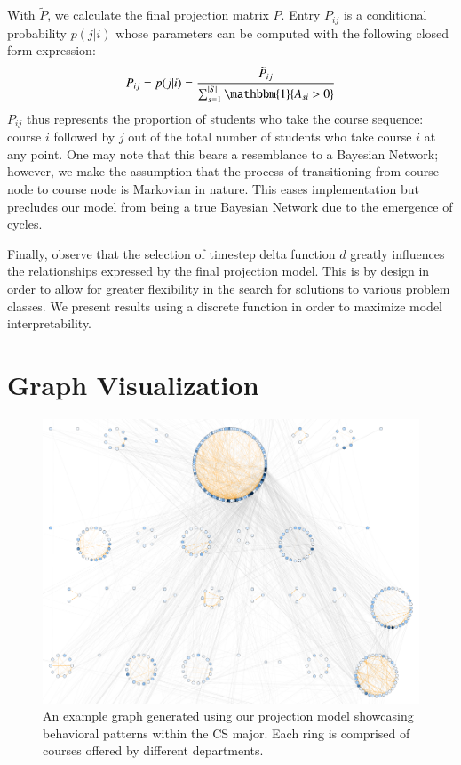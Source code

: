 \documentclass{sigchi}
\begin{document}
With $\tilde{P}$, we calculate the final projection matrix $P$. Entry $P_{ij}$ is a conditional probability $p(j|i)$ whose parameters can be computed with the following closed form expression:
\begin{equation}
    P_{ij} = p(j|i) = \frac{\tilde{P}_{ij}}{\sum_{s=1}^{|S|}\mathbbm{1}\{A_{si} > 0\}}
\end{equation}
$P_{ij}$ thus represents the proportion of students who take the course sequence: course $i$ followed by $j$ out of the total number of students who take course $i$ at any point. One may note that this bears a resemblance to a Bayesian Network; however, we make the assumption that the process of transitioning from course node to course node is Markovian in nature. This eases implementation but precludes our model from being a true Bayesian Network due to the emergence of cycles.

Finally, observe that the selection of timestep delta function $d$ greatly influences the relationships expressed by the final projection model. This is by design in order to allow for greater flexibility in the search for solutions to various problem classes. We present results using a discrete function in order to maximize model interpretability.

\section{Graph Visualization}
\label{sec:visualization}

\begin{figure}
    \centering
    \includegraphics[width=\columnwidth]{final-overview.pdf}
    \caption{An example graph generated using our projection model showcasing behavioral patterns within the CS major. Each ring is comprised of courses offered by different departments.}
    \label{fig:overview}
\end{figure}
\end{document}

